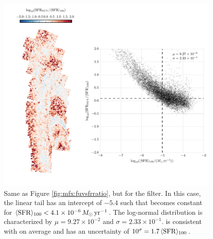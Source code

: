 \begin{figure}
\centering
\includegraphics[width=\textwidth]{m31flux-figures/sfr_nuv-vs-mean.pdf}
\caption[Ratio of the \sfr{} based on the observed extinction-corrected \nuv{}
flux to the $100\myr$ mean \sfr{}.]{Same as Figure \ref{fig:mfx:fuvsfrratio},
    but for the \nuv{} filter. In this case, the linear tail has an intercept
    of $-5.4$ such that \sfrnuv{} becomes constant for $\langle\mathrm{SFR}\rangle_{100} < 4.1\times
    10^{-6}\,M_\odot\,\mathrm{yr}^{-1}$. The log-normal distribution is characterized by $\mu
    = 9.27\times 10^{-2}$ and $\sigma = 2.33\times 10^{-1}$. \sfrnuv{} is
    consistent with \sfroneh{} on average and has an uncertainty of $10^\sigma
    = 1.7\, \langle\mathrm{SFR}\rangle_{100}$.
}
\label{fig:mfx:nuvsfrratio}
\end{figure}


